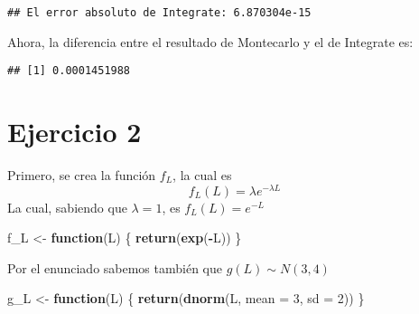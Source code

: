 \documentclass[
]{article}
\newenvironment{Shaded}{\begin{snugshade}}{\end{snugshade}}
\newcommand{\AttributeTok}[1]{\textcolor[rgb]{0.13,0.29,0.53}{#1}}
\newcommand{\ControlFlowTok}[1]{\textcolor[rgb]{0.13,0.29,0.53}{\textbf{#1}}}
\newcommand{\DecValTok}[1]{\textcolor[rgb]{0.00,0.00,0.81}{#1}}
\newcommand{\FunctionTok}[1]{\textcolor[rgb]{0.13,0.29,0.53}{\textbf{#1}}}
\newcommand{\NormalTok}[1]{#1}
\newcommand{\OtherTok}[1]{\textcolor[rgb]{0.56,0.35,0.01}{#1}}
\newcommand{\SpecialCharTok}[1]{\textcolor[rgb]{0.81,0.36,0.00}{\textbf{#1}}}
\newcommand{\StringTok}[1]{\textcolor[rgb]{0.31,0.60,0.02}{#1}}
\begin{document}
\begin{Shaded}
\end{Shaded}

\begin{verbatim}
## El error absoluto de Integrate: 6.870304e-15
\end{verbatim}

Ahora, la diferencia entre el resultado de Montecarlo y el de Integrate
es:

\begin{Shaded}
\end{Shaded}

\begin{verbatim}
## [1] 0.0001451988
\end{verbatim}

\hypertarget{ejercicio-2}{%
\section{Ejercicio 2}\label{ejercicio-2}}

Primero, se crea la función \(f_L\), la cual es \[
f_L(L)= \lambda e^{-\lambda L}
\] La cual, sabiendo que \(\lambda = 1\), es \(f_L(L)= e^{-L}\)

\begin{Shaded}
\begin{Highlighting}[]
\NormalTok{f\_L }\OtherTok{\textless{}{-}} \ControlFlowTok{function}\NormalTok{(L) \{}
  \FunctionTok{return}\NormalTok{(}\FunctionTok{exp}\NormalTok{(}\SpecialCharTok{{-}}\NormalTok{L)) }
\NormalTok{\}}
\end{Highlighting}
\end{Shaded}

Por el enunciado sabemos también que \(g(L) \sim N(3, 4)\)

\begin{Shaded}
\begin{Highlighting}[]
\NormalTok{g\_L }\OtherTok{\textless{}{-}} \ControlFlowTok{function}\NormalTok{(L) \{}
  \FunctionTok{return}\NormalTok{(}\FunctionTok{dnorm}\NormalTok{(L, }\AttributeTok{mean =} \DecValTok{3}\NormalTok{, }\AttributeTok{sd =} \DecValTok{2}\NormalTok{))}
\NormalTok{\}}
\end{Highlighting}
\end{Shaded}
\end{document}
